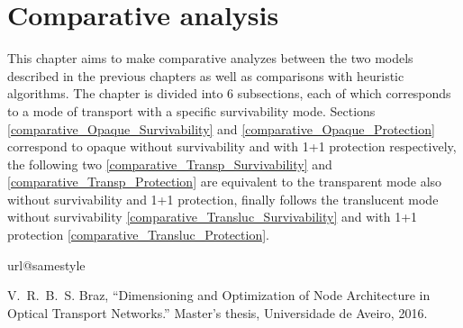 
\chapter{Comparative analysis}
\label{chap_comparative}
This chapter aims to make comparative analyzes between the two models described in the previous chapters as well as comparisons with heuristic algorithms. The chapter is divided into 6 subsections, each of which corresponds to a mode of transport with a specific survivability mode. Sections \ref{comparative_Opaque_Survivability} and \ref{comparative_Opaque_Protection} correspond to opaque without survivability and with 1+1 protection respectively, the following two \ref{comparative_Transp_Survivability} and \ref{comparative_Transp_Protection} are equivalent to the transparent mode also without survivability and 1+1 protection, finally follows the translucent mode without survivability \ref{comparative_Transluc_Survivability} and with 1+1 protection \ref{comparative_Transluc_Protection}.










{}
%
\renewcommand{\bibname}{References}
%
%
%
%
\begin{thebibliography}{10}
\providecommand{\url}[1]{#1}
\csname url@samestyle\endcsname
\providecommand{\newblock}{\relax}
\providecommand{\bibinfo}[2]{#2}
\providecommand{\BIBentrySTDinterwordspacing}{\spaceskip=0pt\relax}
\providecommand{\BIBentryALTinterwordstretchfactor}{4}
\providecommand{\BIBentryALTinterwordspacing}{\spaceskip=\fontdimen2\font plus
\BIBentryALTinterwordstretchfactor\fontdimen3\font minus
  \fontdimen4\font\relax}
\providecommand{\BIBforeignlanguage}[2]{{%
\expandafter\ifx\csname l@#1\endcsname\relax
\typeout{** WARNING: IEEEtran.bst: No hyphenation pattern has been}%
\typeout{** loaded for the language `#1'. Using the pattern for}%
\typeout{** the default language instead.}%
\else
\language=\csname l@#1\endcsname
\fi
#2}}
\providecommand{\BIBdecl}{\relax}
\BIBdecl

V.~R.~B.~S. Braz, ``Dimensioning and Optimization of Node Architecture in Optical Transport Networks.'' Master's thesis, Universidade de Aveiro, 2016.

\end{thebibliography}
